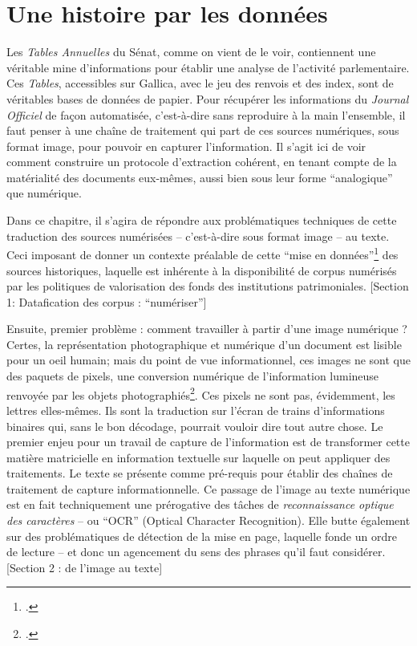 \chapter{Une histoire par les données}

Les \emph{Tables Annuelles} du Sénat, comme on vient de le voir, contiennent une véritable mine d'informations pour établir une analyse de l'activité parlementaire. Ces \emph{Tables}, accessibles sur Gallica, avec le jeu des renvois et des index, sont de véritables bases de données de papier. Pour récupérer les informations du \emph{Journal Officiel} de façon automatisée, c'est-à-dire sans reproduire à la main l'ensemble, il faut penser à une chaîne de traitement qui part de ces sources numériques, sous format image, pour pouvoir en capturer l'information. Il s'agit ici de voir comment construire un protocole d’extraction cohérent, en tenant compte de la matérialité des documents eux-mêmes, aussi bien sous leur forme \enquote{analogique} que numérique. 

Dans ce chapitre, il s'agira de répondre aux problématiques techniques de cette traduction des sources numérisées -- c'est-à-dire sous format image -- au texte. Ceci imposant de donner un contexte préalable de cette \enquote{mise en données}\footcite[][]{clavert} des sources historiques, laquelle est inhérente à la disponibilité de corpus numérisés par les politiques de valorisation des fonds des institutions patrimoniales. [Section 1: Datafication des corpus : \enquote{numériser}]

Ensuite, premier problème : comment travailler à partir d'une image numérique ? Certes, la représentation photographique et numérique d'un document est lisible pour un oeil humain; mais du point de vue informationnel, ces images ne sont que des paquets de pixels, une conversion numérique de l'information lumineuse renvoyée par les objets photographiés\footcite[][]{claerr}. Ces pixels ne sont pas, évidemment, les lettres elles-mêmes. Ils sont la traduction sur l'écran de trains d'informations binaires qui, sans le bon décodage, pourrait vouloir dire tout autre chose. Le premier enjeu pour un travail de capture de l'information est de transformer cette matière matricielle en information textuelle sur laquelle on peut appliquer des traitements. Le texte se présente comme pré-requis pour établir des chaînes de traitement de capture informationnelle. Ce passage de l'image au texte numérique est en fait techniquement une prérogative des tâches de \emph{reconnaissance optique des caractères} -- ou \enquote{OCR} (Optical Character Recognition). Elle butte également sur des problématiques de détection de la mise en page, laquelle fonde un ordre de lecture -- et donc un agencement du sens des phrases qu'il faut considérer. [Section 2 : de l'image au texte]

